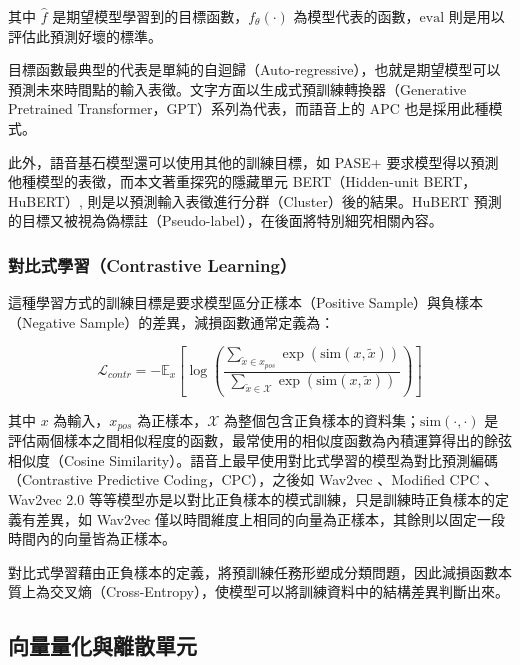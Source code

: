 其中 $\hat{f}$ 是期望模型學習到的目標函數，$f_\theta(\cdot)$ 為模型代表的函數，$\text{eval}$ 則是用以評估此預測好壞的標準。

目標函數最典型的代表是單純的自迴歸（Auto-regressive），也就是期望模型可以預測未來時間點的輸入表徵。文字方面以生成式預訓練轉換器（Generative Pretrained Transformer，GPT\cite{radford_language_nodate, brown_language_2020}）系列為代表，而語音上的 APC \cite{chung_generative_2020} 也是採用此種模式。

此外，語音基石模型還可以使用其他的訓練目標，如 PASE+ \cite{ravanelli_multi-task_2020} 要求模型得以預測他種模型的表徵，而本文著重探究的隱藏單元 BERT（Hidden-unit BERT，HuBERT）\cite{hsu_hubert_2021, hsu_hubert_2021-2}, 則是以預測輸入表徵進行分群（Cluster）後的結果。HuBERT 預測的目標又被視為偽標註（Pseudo-label），在後面將特別細究相關內容。

\subsubsection{對比式學習（Contrastive Learning）}

這種學習方式的訓練目標是要求模型區分正樣本（Positive Sample）與負樣本（Negative Sample）的差異，減損函數通常定義為：

$$\mathcal{L}_{contr} = -\mathbb{E}_x\left[\log
\left(
{\frac
{\sum_{\tilde{x} \in x_{pos}}\exp(\text{sim}(x, \tilde{x}))}
{\sum_{\tilde{x} \in \mathcal{X}}\exp(\text{sim}(x, \tilde{x}))}
}\right)\right]$$

其中 $x$ 為輸入，$x_{pos}$ 為正樣本，$\mathcal{X}$ 為整個包含正負樣本的資料集；$\text{sim}(\cdot, \cdot)$ 是評估兩個樣本之間相似程度的函數，最常使用的相似度函數為內積運算得出的餘弦相似度（Cosine Similarity）。語音上最早使用對比式學習的模型為對比預測編碼（Contrastive Predictive Coding，CPC）\cite{maekaku2022speech}，之後如 Wav2vec \cite{schneider2019wav2vec}、Modified CPC \cite{rivière2020unsupervised}、Wav2vec 2.0 \cite{baevski2020wav2vec} 等等模型亦是以對比正負樣本的模式訓練，只是訓練時正負樣本的定義有差異，如 Wav2vec 僅以時間維度上相同的向量為正樣本，其餘則以固定一段時間內的向量皆為正樣本。

對比式學習藉由正負樣本的定義，將預訓練任務形塑成分類問題，因此減損函數本質上為交叉熵（Cross-Entropy），使模型可以將訓練資料中的結構差異判斷出來。

\subsection{向量量化與離散單元}


